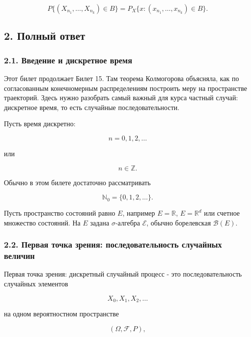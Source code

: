 \documentclass[
  11pt,
  a4paper,
]{article}
\begin{document}
\[
P\{(X_{n_1},\ldots,X_{n_k})\in B\}
=
P_X\{x:(x_{n_1},\ldots,x_{n_k})\in B\}.
\]

\subsection{2. Полный
ответ}\label{ux43fux43eux43bux43dux44bux439-ux43eux442ux432ux435ux442}

\subsubsection{2.1. Введение и дискретное
время}\label{ux432ux432ux435ux434ux435ux43dux438ux435-ux438-ux434ux438ux441ux43aux440ux435ux442ux43dux43eux435-ux432ux440ux435ux43cux44f}

Этот билет продолжает Билет 15. Там теорема Колмогорова объясняла, как
по согласованным конечномерным распределениям построить меру на
пространстве траекторий. Здесь нужно разобрать самый важный для курса
частный случай: дискретное время, то есть случайные последовательности.

Пусть время дискретно:

\[
n=0,1,2,\ldots
\]

или

\[
n\in\mathbb Z.
\]

Обычно в этом билете достаточно рассматривать

\[
\mathbb N_0=\{0,1,2,\ldots\}.
\]

Пусть пространство состояний равно \(E\), например \(E=\mathbb R\),
\(E=\mathbb R^d\) или счетное множество состояний. На \(E\) задана
\(\sigma\)-алгебра \(\mathcal E\), обычно борелевская \(\mathcal B(E)\).

\subsubsection{2.2. Первая точка зрения: последовательность случайных
величин}\label{ux43fux435ux440ux432ux430ux44f-ux442ux43eux447ux43aux430-ux437ux440ux435ux43dux438ux44f-ux43fux43eux441ux43bux435ux434ux43eux432ux430ux442ux435ux43bux44cux43dux43eux441ux442ux44c-ux441ux43bux443ux447ux430ux439ux43dux44bux445-ux432ux435ux43bux438ux447ux438ux43d}

Первая точка зрения: дискретный случайный процесс - это
последовательность случайных элементов

\[
X_0,X_1,X_2,\ldots
\]

на одном вероятностном пространстве

\[
(\Omega,\mathcal F,P),
\]
\end{document}
